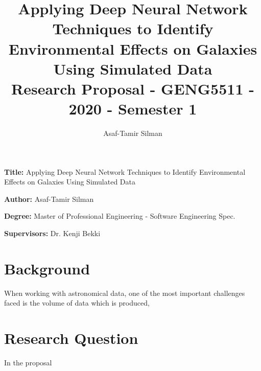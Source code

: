 \documentclass[12pt, a4paper]{article}
\title{
    Applying Deep Neural Network Techniques to Identify Environmental Effects on Galaxies Using Simulated Data\large \\
    Research Proposal - GENG5511 - 2020 - Semester 1
}
\author{Asaf-Tamir Silman}
\date{}
\newcommand{\namelistlabel}[1]{\mbox{#1}\hfil}
\newenvironment{namelist}[1]{%
\begin{list}{}
    {
        \let\makelabel\namelistlabel
        \settowidth{\labelwidth}{#1}
        \setlength{\leftmargin}{1.1\labelwidth}
    }
  }{%
\end{list}}
\begin{document}
\maketitle

\begin{namelist}{}
    \item[{\bf Title:}]
        Applying Deep Neural Network Techniques to Identify Environmental Effects on Galaxies Using Simulated Data
    \item[{\bf Author:}]
        Asaf-Tamir Silman
    \item[{\bf Degree:}]
        Master of Professional Engineering - Software Engineering Spec.
    \item[{\bf Supervisors:}]
        Dr. Kenji Bekki
    \end{namelist}

\section{Background}
When working with astronomical data, one of the most important challenges faced is the volume of data which is produced, 

\section{Research Question}
In the proposal
\end{document}
